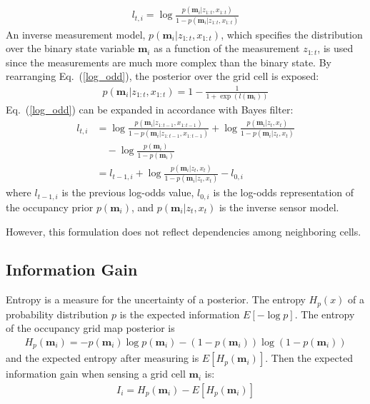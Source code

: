 \documentclass[letterpaper, 10 pt, conference]{ieeeconf}  %
\begin{document}
\begin{align}
    l_{t,i} = \log\frac{p(\textbf{m}_i | z_{1:t},x_{1:t})}{1-p(\textbf{m}_i | z_{1:t},x_{1:t})}
    \label{log_odd}
\end{align}
An inverse measurement model, $p(\textbf{m}_i | z_{1:t},x_{1:t})$, which specifies the distribution over the binary state variable $\textbf{m}_i$ as a function of the measurement $z_{1:t}$, is used since the measurements are much more complex than the binary state. 
\noindent By rearranging Eq.~(\ref{log_odd}), the posterior over the grid cell is exposed:
\begin{align}
    p(\textbf{m}_i | z_{1:t},x_{1:t}) = 1-\frac{1}{1+\exp(l(\textbf{m}_i))}
\end{align}
\noindent Eq.~(\ref{log_odd}) can be expanded in accordance with Bayes filter:
\begin{align}
    l_{t,i} &= \log\frac{p(\textbf{m}_i | z_{1:t-1}, x_{1:t-1})}{1-p(\textbf{m}_i | z_{1:t-1}, x_{1:t-1})} + \log\frac{p(\textbf{m}_i | z_{t},x_{t})}{1-p(\textbf{m}_i | z_{t},x_{t})} \nonumber \\
    &\quad - \log\frac{p(\textbf{m}_i)}{1-p(\textbf{m}_i)} \nonumber \\
    &= l_{t-1,i} + \log\frac{p(\textbf{m}_i | z_{t},x_{t})}{1-p(\textbf{m}_i | z_{t},x_{t})} - l_{0,i}
\end{align}
\noindent where $l_{t-1,i}$ is the previous log-odds value, $l_{0,i}$ is the log-odds representation of the occupancy prior $p(\textbf{m}_i)$, and $p(\textbf{m}_i | z_{t},x_{t})$ is the inverse sensor model.

However, this formulation does not reflect dependencies among neighboring cells. 

\subsection{Information Gain}
Entropy is a measure for the uncertainty of a posterior. The entropy $H_p(x)$ of a probability distribution $p$ is the expected information $E[-\log p]$. The entropy of the occupancy grid map posterior is
\begin{align}
    H_p(\textbf{m}_i) = -p(\textbf{m}_i) \log p(\textbf{m}_i) - (1-p(\textbf{m}_i)) \log(1-p(\textbf{m}_i))
\end{align}
\noindent and the expected entropy after measuring is $E[H_{p}(\textbf{m}_i)]$. Then the expected information gain when sensing a grid cell $\textbf{m}_i$ is: 
\begin{align}
    I_i = H_p(\textbf{m}_i) - E[H_{p}(\textbf{m}_i)]
\end{align}
\end{document}
